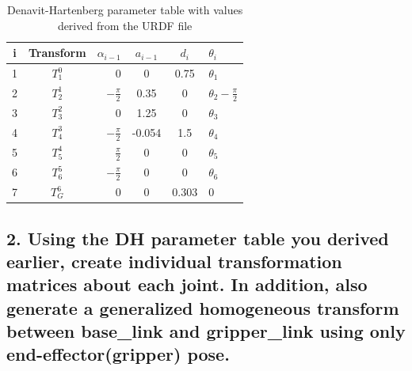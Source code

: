 \documentclass{article}
\begin{document}
\begin{table}[H]
\centering
\begin{tabular}{|c|c|r|c|c|l|}
    \hline
    i & Transform & $\alpha _{i-1}$ & $a_{i-1}$ & $d_i$ & $\theta _i$ \\ \hline
    1 & $T_1^0$ & 0 & 0 & 0.75 & $\theta _1$ \\ \hline
    2 & $T_2^1$ & $-\frac{\pi}{2}$ & 0.35 & 0 & $\theta _2 - \frac{\pi}{2}$ \\ \hline
    3 & $T_3^2$ & 0 & 1.25 & 0 & $\theta _3$ \\ \hline
    4 & $T_4^3$ & $-\frac{\pi}{2}$ & -0.054 & 1.5 & $\theta _4$ \\ \hline
    5 & $T_5^4$ & $\frac{\pi}{2}$ & 0 & 0 & $\theta _5$ \\ \hline
    6 & $T_6^5$ & $-\frac{\pi}{2}$ & 0 & 0 & $\theta _6$ \\ \hline
    7 & $T_G^6$ & 0 & 0 & 0.303 & 0 \\ \hline

\end{tabular}
\caption{\label{tab:table-name}Denavit-Hartenberg parameter table with values derived from the URDF file}
\end{table}

\subsection{2. Using the DH parameter table you derived earlier, create individual transformation matrices about each joint. In addition, also generate a generalized homogeneous transform between base\_link and gripper\_link using only end-effector(gripper) pose.}
\end{document}
